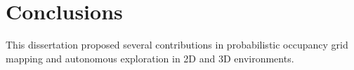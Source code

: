 \chapter{Conclusions}\label{chap:Conclusions}

This dissertation proposed several contributions in probabilistic occupancy grid mapping and autonomous exploration in 2D and 3D environments.


